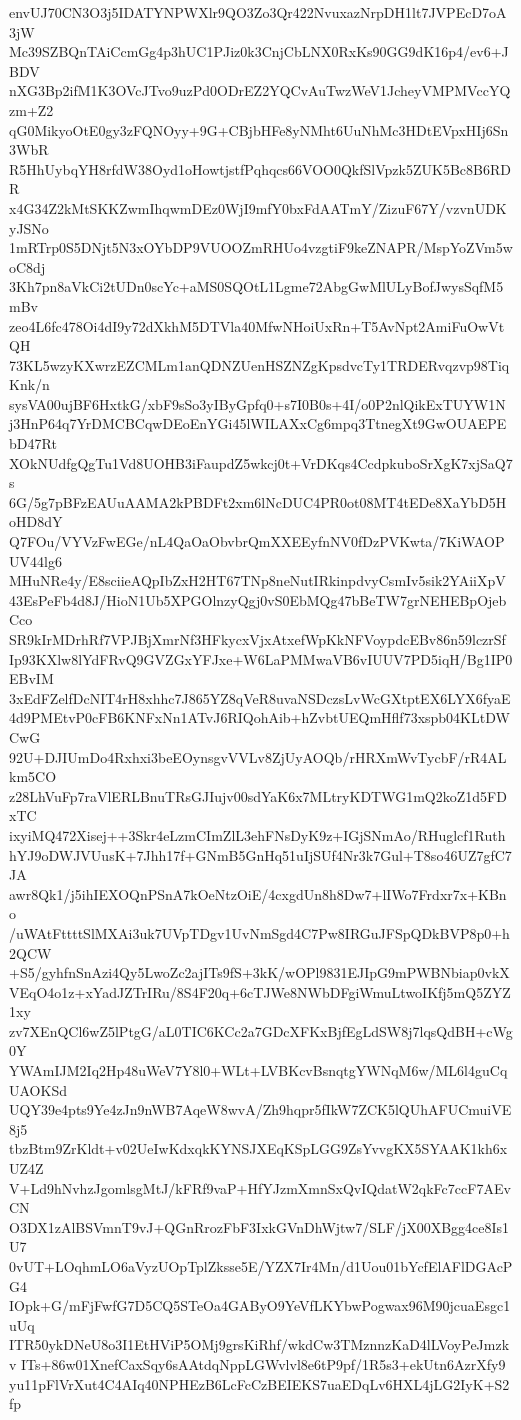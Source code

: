 envUJ70CN3O3j5IDATYNPWXlr9QO3Zo3Qr422NvuxazNrpDH1lt7JVPEcD7oA3jW
Mc39SZBQnTAiCcmGg4p3hUC1PJiz0k3CnjCbLNX0RxKs90GG9dK16p4/ev6+JBDV
nXG3Bp2ifM1K3OVcJTvo9uzPd0ODrEZ2YQCvAuTwzWeV1JcheyVMPMVccYQzm+Z2
qG0MikyoOtE0gy3zFQNOyy+9G+CBjbHFe8yNMht6UuNhMc3HDtEVpxHIj6Sn3WbR
R5HhUybqYH8rfdW38Oyd1oHowtjstfPqhqcs66VOO0QkfSlVpzk5ZUK5Bc8B6RDR
x4G34Z2kMtSKKZwmIhqwmDEz0WjI9mfY0bxFdAATmY/ZizuF67Y/vzvnUDKyJSNo
1mRTrp0S5DNjt5N3xOYbDP9VUOOZmRHUo4vzgtiF9keZNAPR/MspYoZVm5woC8dj
3Kh7pn8aVkCi2tUDn0scYc+aMS0SQOtL1Lgme72AbgGwMlULyBofJwysSqfM5mBv
zeo4L6fc478Oi4dI9y72dXkhM5DTVla40MfwNHoiUxRn+T5AvNpt2AmiFuOwVtQH
73KL5wzyKXwrzEZCMLm1anQDNZUenHSZNZgKpsdvcTy1TRDERvqzvp98TiqKnk/n
sysVA00ujBF6HxtkG/xbF9sSo3yIByGpfq0+s7I0B0s+4I/o0P2nlQikExTUYW1N
j3HnP64q7YrDMCBCqwDEoEnYGi45lWILAXxCg6mpq3TtnegXt9GwOUAEPEbD47Rt
XOkNUdfgQgTu1Vd8UOHB3iFaupdZ5wkcj0t+VrDKqs4CcdpkuboSrXgK7xjSaQ7s
6G/5g7pBFzEAUuAAMA2kPBDFt2xm6lNcDUC4PR0ot08MT4tEDe8XaYbD5HoHD8dY
Q7FOu/VYVzFwEGe/nL4QaOaObvbrQmXXEEyfnNV0fDzPVKwta/7KiWAOPUV44lg6
MHuNRe4y/E8sciieAQpIbZxH2HT67TNp8neNutIRkinpdvyCsmIv5sik2YAiiXpV
43EsPeFb4d8J/HioN1Ub5XPGOlnzyQgj0vS0EbMQg47bBeTW7grNEHEBpOjebCco
SR9kIrMDrhRf7VPJBjXmrNf3HFkycxVjxAtxefWpKkNFVoypdcEBv86n59lczrSf
Ip93KXlw8lYdFRvQ9GVZGxYFJxe+W6LaPMMwaVB6vIUUV7PD5iqH/Bg1IP0EBvIM
3xEdFZelfDcNIT4rH8xhhc7J865YZ8qVeR8uvaNSDczsLvWcGXtptEX6LYX6fyaE
4d9PMEtvP0cFB6KNFxNn1ATvJ6RIQohAib+hZvbtUEQmHflf73xspb04KLtDWCwG
92U+DJIUmDo4Rxhxi3beEOynsgvVVLv8ZjUyAOQb/rHRXmWvTycbF/rR4ALkm5CO
z28LhVuFp7raVlERLBnuTRsGJIujv00sdYaK6x7MLtryKDTWG1mQ2koZ1d5FDxTC
ixyiMQ472Xisej++3Skr4eLzmCImZlL3ehFNsDyK9z+IGjSNmAo/RHuglcf1Ruth
hYJ9oDWJVUusK+7Jhh17f+GNmB5GnHq51uIjSUf4Nr3k7Gul+T8so46UZ7gfC7JA
awr8Qk1/j5ihIEXOQnPSnA7kOeNtzOiE/4cxgdUn8h8Dw7+lIWo7Frdxr7x+KBno
/uWAtFttttSlMXAi3uk7UVpTDgv1UvNmSgd4C7Pw8IRGuJFSpQDkBVP8p0+h2QCW
+S5/gyhfnSnAzi4Qy5LwoZc2ajITs9fS+3kK/wOPl9831EJIpG9mPWBNbiap0vkX
VEqO4o1z+xYadJZTrIRu/8S4F20q+6cTJWe8NWbDFgiWmuLtwoIKfj5mQ5ZYZ1xy
zv7XEnQCl6wZ5lPtgG/aL0TIC6KCc2a7GDcXFKxBjfEgLdSW8j7lqsQdBH+cWg0Y
YWAmIJM2Iq2Hp48uWeV7Y8l0+WLt+LVBKcvBsnqtgYWNqM6w/ML6l4guCqUAOKSd
UQY39e4pts9Ye4zJn9nWB7AqeW8wvA/Zh9hqpr5fIkW7ZCK5lQUhAFUCmuiVE8j5
tbzBtm9ZrKldt+v02UeIwKdxqkKYNSJXEqKSpLGG9ZsYvvgKX5SYAAK1kh6xUZ4Z
V+Ld9hNvhzJgomlsgMtJ/kFRf9vaP+HfYJzmXmnSxQvIQdatW2qkFc7ccF7AEvCN
O3DX1zAlBSVmnT9vJ+QGnRrozFbF3IxkGVnDhWjtw7/SLF/jX00XBgg4ce8Is1U7
0vUT+LOqhmLO6aVyzUOpTplZksse5E/YZX7Ir4Mn/d1Uou01bYcfElAFlDGAcPG4
IOpk+G/mFjFwfG7D5CQ5STeOa4GAByO9YeVfLKYbwPogwax96M90jcuaEsgc1uUq
ITR50ykDNeU8o3I1EtHViP5OMj9grsKiRhf/wkdCw3TMznnzKaD4lLVoyPeJmzkv
ITs+86w01XnefCaxSqy6sAAtdqNppLGWvlvl8e6tP9pf/1R5s3+ekUtn6AzrXfy9
yu11pFlVrXut4C4AIq40NPHEzB6LcFcCzBEIEKS7uaEDqLv6HXL4jLG2IyK+S2fp

